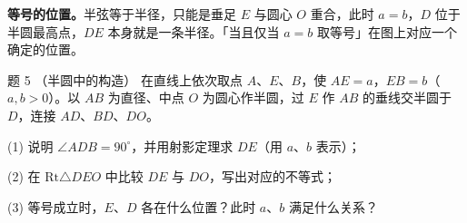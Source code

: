 \textbf{等号的位置。}半弦等于半径，只能是垂足 $E$ 与圆心 $O$ 重合，此时 $a=b$，$D$ 位于半圆最高点，$DE$ 本身就是一条半径。「当且仅当 $a=b$ 取等号」在图上对应一个确定的位置。

\begin{problem}{题 5 （半圆中的构造）}
在直线上依次取点 $A$、$E$、$B$，使 $AE=a$，$EB=b$（$a,b>0$）。以 $AB$ 为直径、中点 $O$ 为圆心作半圆，过 $E$ 作 $AB$ 的垂线交半圆于 $D$，连接 $AD$、$BD$、$DO$。

(1) 说明 $\angle ADB=90^\circ$，并用射影定理求 $DE$（用 $a$、$b$ 表示）；

(2) 在 $\mathrm{Rt}\triangle DEO$ 中比较 $DE$ 与 $DO$，写出对应的不等式；

(3) 等号成立时，$E$、$D$ 各在什么位置？此时 $a$、$b$ 满足什么关系？
\end{problem}

\clearpage
